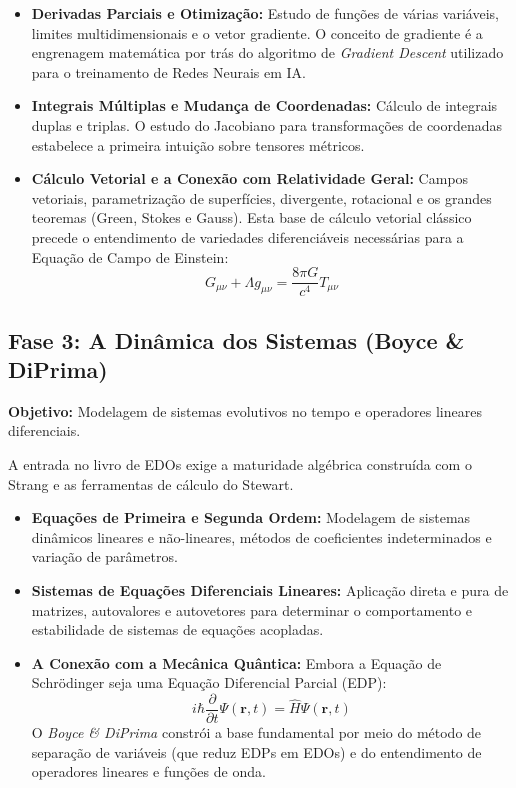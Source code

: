 \documentclass[11pt,a4paper]{article}
\begin{document}
\begin{itemize}[leftmargin=1.5cm]
    \item[\textbf{2.1}] \textbf{Derivadas Parciais e Otimização:} 
    Estudo de funções de várias variáveis, limites multidimensionais e o vetor gradiente. O conceito de gradiente é a engrenagem matemática por trás do algoritmo de \textit{Gradient Descent} utilizado para o treinamento de Redes Neurais em IA.
    
    \item[\textbf{2.2}] \textbf{Integrais Múltiplas e Mudança de Coordenadas:}
    Cálculo de integrais duplas e triplas. O estudo do Jacobiano para transformações de coordenadas estabelece a primeira intuição sobre tensores métricos.
    
    \item[\textbf{2.3}] \textbf{Cálculo Vetorial e a Conexão com Relatividade Geral:}
    Campos vetoriais, parametrização de superfícies, divergente, rotacional e os grandes teoremas (Green, Stokes e Gauss). Esta base de cálculo vetorial clássico precede o entendimento de variedades diferenciáveis necessárias para a Equação de Campo de Einstein:
    \begin{equation}
        G_{\mu\nu} + \Lambda g_{\mu\nu} = \frac{8\pi G}{c^4} T_{\mu\nu}
    \end{equation}
\end{itemize}

\subsection{Fase 3: A Dinâmica dos Sistemas (Boyce \& DiPrima)}
\textbf{Objetivo:} Modelagem de sistemas evolutivos no tempo e operadores lineares diferenciais.

A entrada no livro de EDOs exige a maturidade algébrica construída com o Strang e as ferramentas de cálculo do Stewart.

\begin{itemize}[leftmargin=1.5cm]
    \item[\textbf{3.1}] \textbf{Equações de Primeira e Segunda Ordem:}
    Modelagem de sistemas dinâmicos lineares e não-lineares, métodos de coeficientes indeterminados e variação de parâmetros.
    
    \item[\textbf{3.2}] \textbf{Sistemas de Equações Diferenciais Lineares:}
    Aplicação direta e pura de matrizes, autovalores e autovetores para determinar o comportamento e estabilidade de sistemas de equações acopladas.
    
    \item[\textbf{3.3}] \textbf{A Conexão com a Mecânica Quântica:}
    Embora a Equação de Schrödinger seja uma Equação Diferencial Parcial (EDP):
    \begin{equation}
        i\hbar \frac{\partial}{\partial t}\Psi(\mathbf{r},t) = \hat{H}\Psi(\mathbf{r},t)
    \end{equation}
    O \textit{Boyce \& DiPrima} constrói a base fundamental por meio do método de separação de variáveis (que reduz EDPs em EDOs) e do entendimento de operadores lineares e funções de onda.
\end{itemize}
\end{document}
